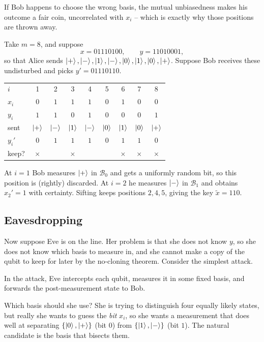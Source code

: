\documentclass[a4paper]{scrartcl}
\newcommand{\Bs}{\mathcal{B}}
\begin{document}
If Bob happens to choose the wrong basis, the mutual unbiasedness makes his outcome a fair coin, uncorrelated with $x_i$ -- which is exactly why those positions are thrown away.

\begin{example}
	Take $m = 8$, and suppose
	$$x = 01110100, \qquad y = 11010001,$$
	so that Alice sends $\ket{+},\ket{-},\ket{1},\ket{-},\ket{0},\ket{1},\ket{0},\ket{+}$. Suppose Bob receives these undisturbed and picks $y' = 01110110$.
	\begin{center}
	\begin{tabular}{l c c c c c c c c}
		$i$ & 1 & 2 & 3 & 4 & 5 & 6 & 7 & 8 \\[2pt]
		$x_i$ & $0$ & $1$ & $1$ & $1$ & $0$ & $1$ & $0$ & $0$\\
		$y_i$ & $1$ & $1$ & $0$ & $1$ & $0$ & $0$ & $0$ & $1$ \\
		sent & $\ket{+}$ & $\ket{-}$ & $\ket{1}$ & $\ket{-}$ & $\ket{0}$ & $\ket{1}$ & $\ket{0}$ & $\ket{+}$\\
		$y_i'$ & $0$ & $1$ & $1$ & $1$ & $0$ & $1$ & $1$ & $0$ \\
		keep? & $\times$ & \checkmark & $\times$ & \checkmark & \checkmark & $\times$ & $\times$ & $\times$
	\end{tabular}
	\end{center}
	At $i = 1$ Bob measures $\ket{+}$ in $\Bs_0$ and gets a uniformly random bit, so this position is (rightly) discarded. At $i = 2$ he measures $\ket{-}$ in $\Bs_1$ and obtains $x_2' = 1$ with certainty. Sifting keeps positions $2, 4, 5$, giving the key $\widetilde x = 110$.
\end{example}

\subsection{Eavesdropping}

Now suppose Eve is on the line. Her problem is that she does not know $y$, so she does not know which basis to measure in, and she cannot make a copy of the qubit to keep for later by the no-cloning theorem. Consider the simplest attack.

\begin{definition}
	In the  attack, Eve intercepts each qubit, measures it in some fixed basis, and forwards the post-measurement state to Bob.
\end{definition}

Which basis should she use? She is trying to distinguish four equally likely states, but really she wants to guess the \emph{bit} $x_i$, so she wants a measurement that does well at separating $\{\ket{0},\ket{+}\}$ (bit $0$) from $\{\ket{1},\ket{-}\}$ (bit $1$). The natural candidate is the basis that bisects them.
\end{document}

